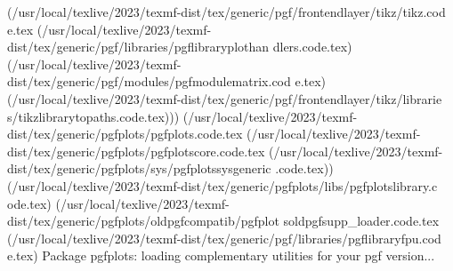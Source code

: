 (/usr/local/texlive/2023/texmf-dist/tex/generic/pgf/frontendlayer/tikz/tikz.cod
e.tex
(/usr/local/texlive/2023/texmf-dist/tex/generic/pgf/libraries/pgflibraryplothan
dlers.code.tex)
(/usr/local/texlive/2023/texmf-dist/tex/generic/pgf/modules/pgfmodulematrix.cod
e.tex)
(/usr/local/texlive/2023/texmf-dist/tex/generic/pgf/frontendlayer/tikz/librarie
s/tikzlibrarytopaths.code.tex)))
(/usr/local/texlive/2023/texmf-dist/tex/generic/pgfplots/pgfplots.code.tex
(/usr/local/texlive/2023/texmf-dist/tex/generic/pgfplots/pgfplotscore.code.tex
(/usr/local/texlive/2023/texmf-dist/tex/generic/pgfplots/sys/pgfplotssysgeneric
.code.tex))
(/usr/local/texlive/2023/texmf-dist/tex/generic/pgfplots/libs/pgfplotslibrary.c
ode.tex)
(/usr/local/texlive/2023/texmf-dist/tex/generic/pgfplots/oldpgfcompatib/pgfplot
soldpgfsupp_loader.code.tex
(/usr/local/texlive/2023/texmf-dist/tex/generic/pgf/libraries/pgflibraryfpu.cod
e.tex)
Package pgfplots: loading complementary utilities for your pgf version...

